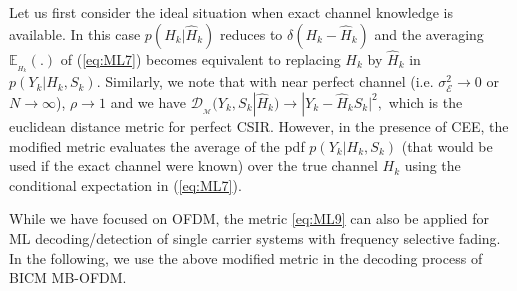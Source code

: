 \documentclass{article}
\def\Hh{{\widehat H}}
\begin{document}
Let us first consider the ideal situation when exact channel knowledge is available. In this case $p(H_k|\Hh_k)$ reduces to $\delta(H_k-\Hh_k)$ and the averaging $\mathbb{E}_{_{H_k}}(.)$ of (\ref{eq:ML7}) becomes equivalent to replacing $H_k$ by $\Hh_k$ in $p(Y_k|H_k,S_k)$.  
Similarly, we note that with near perfect channel (i.e. $\sigma^2_\mathcal{E}\to 0$ or $N \to \infty$), $\rho \to 1$ and we have $    \mathcal{D}_{_\mathcal{M}}(Y_k,S_k|\Hh_k) \to |Y_k-\Hh_k S_k|^2, $ which is the euclidean distance metric for perfect CSIR. However, in the presence of CEE, the modified metric evaluates the average of the pdf $p(Y_k|H_k,S_k)$ (that would be used if the exact channel were known) over the true channel $H_k$ using the conditional expectation in (\ref{eq:ML7}). 

While we have focused on OFDM, the metric \eqref{eq:ML9} can also be applied for ML decoding/detection of single carrier systems with frequency selective fading. In the following, we use the above modified metric in the decoding process of BICM MB-OFDM.        
\end{document}
